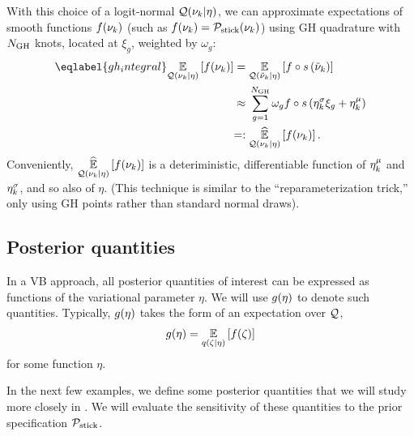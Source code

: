 With this choice of a logit-normal $\mathcal{Q}(\nu_{k} \vert \eta)$,
we can approximate expectations of smooth functions
$f(\nu_{k})$ (such as $f(\nu_{k}) = \mathcal{P}_{\mathrm{stick}}(\nu_{k})$) using GH quadrature with $N_{\mathrm{GH}}$ knots,
located at $\xi_g$, weighted by $\omega_g$:
%
\begin{align}\eqlabel{gh_integral}
%
\expect{\q(\nuk \vert \eta)}{f(\nuk)} ={}&
\expect{\q(\lnu_\k \vert \eta)}
       {f\circ \s\left(\lnu_\k\right)}
\nonumber\\\approx{}&
    \sum_{g=1}^{\ngh} \omega_g f\circ \s \left(\lnusd_\k \xi_{g} + \lnumean_\k\right)
 \nonumber\\=:{}&
\expecthat{\q(\nuk \vert \eta)}{f(\nuk)}.
%
\end{align}
%
Conveniently, $\underset{\mathcal{Q}(\nu_{k} \vert \eta)}{\widehat{\mathbb{E}}}\left[f(\nu_{k})\right]$ is a deteriministic, differentiable
function of $\eta^{\mu}_k$ and $\eta^{\sigma}_k$, and so also of $\eta$.  (This
technique is similar to the ``reparameterization trick,'' only using
GH points rather than standard normal draws).


\subsection{Posterior quantities}

In a VB approach, all posterior quantities of interest can be expressed as
functions of the variational parameter $\eta$. We will use $g(\eta)$ to denote
such quantities. Typically, $g(\eta)$ takes the form of an expectation over $\mathcal{Q}$,
\begin{align*}
  g(\eta) = \underset{q(\zeta\vert\eta)}{\mathbb{E}}\left[f(\zeta)\right]
\end{align*}
for some function $\eta$.

In the next few examples, we define some posterior quantities that we will
study more closely in . We will evaluate the sensitivity
of these quantities to the prior specification $\mathcal{P}_{\mathrm{stick}}$.

